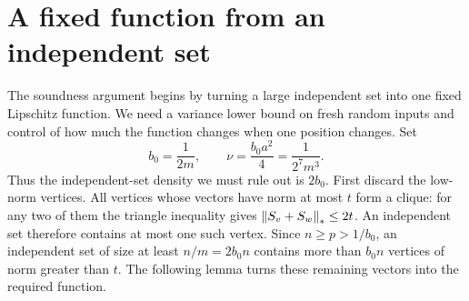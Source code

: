 \section{A fixed function from an independent set}
\label{ana:section}

The soundness argument begins by turning a large independent set into
one fixed Lipschitz function. We need a variance lower bound on fresh
random inputs and control of how much the function changes when one
position changes. Set
\begin{equation}\label{src:variance-parameters}
 b_0=\frac1{2m},\qquad
 \nu=\frac{b_0a^2}{4}=\frac1{2^7m^3}.
\end{equation}
Thus the independent-set density we must rule out is \(2b_0\).
First discard the low-norm vertices. All vertices
whose vectors have norm at most \(t\) form a clique: for any two of
them the triangle inequality gives
\(\left\|S_v+S_w\right\|_*\leq2t\). An independent set therefore contains at
most one such vertex. Since
\(n\geq p>1/b_0\), an independent set of size at least
\(n/m=2b_0n\) contains more than \(b_0n\) vertices of norm greater
than \(t\). The following lemma turns these remaining vectors into
the required function.

